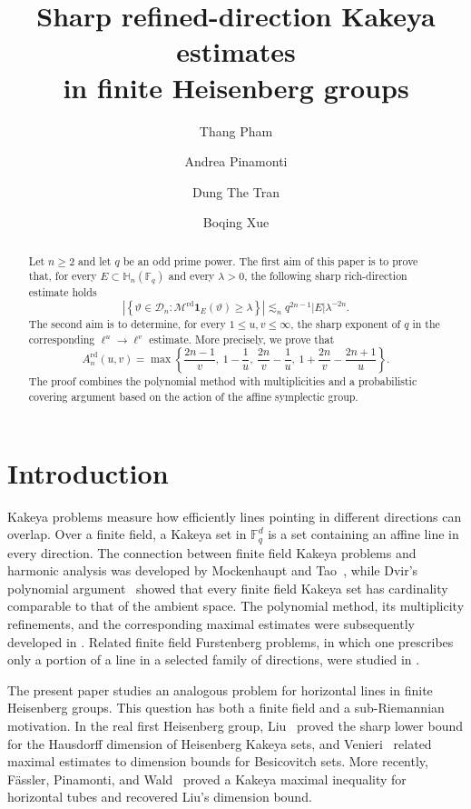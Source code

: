 \documentclass[11pt,letterpaper]{amsart}
\title[Refined-direction Kakeya estimates]
{Sharp refined-direction Kakeya estimates\\
in finite Heisenberg groups}
\author{Thang Pham}
\author{Andrea Pinamonti}
\author{Dung The Tran}
\author{Boqing Xue}
\numberwithin{equation}{section}
\theoremstyle{definition}
\theoremstyle{remark}
\newcommand{\Fq}{\mathbb F_q}
\begin{document}
\begin{abstract}
Let \(n\geq 2\) and let \(q\) be an odd prime power. The first aim of this
paper is to prove that, for every \(E\subset \mathbb{H}_n(\mathbb{F}_q)\)
and every \(\lambda>0\), the following sharp rich-direction estimate holds
\[
 \left|
 \left\{
 \vartheta\in\mathcal{D}_n:
 \mathcal{M}^{\mathrm{rd}}\mathbf{1}_E(\vartheta)\geq\lambda
 \right\}
 \right|
 \lesssim_n
 q^{2n-1}|E|\lambda^{-2n}.
\]
The second aim is to determine, for every \(1\leq u,v\leq\infty\), the
sharp exponent of \(q\) in the corresponding \(\ell^u\to\ell^v\)
estimate. More precisely, we prove that
\[
 A_n^{\mathrm{rd}}(u,v)
 =
 \max\left\{
 \frac{2n-1}{v},\
 1-\frac1u,\
 \frac{2n}{v}-\frac1u,\
 1+\frac{2n}{v}-\frac{2n+1}{u}
 \right\}.
\]
The proof combines the polynomial method with multiplicities and a
probabilistic covering argument based on the action of the affine
symplectic group.
\end{abstract}
\maketitle
\section{Introduction}
\label{sec:introduction}
Kakeya problems measure how efficiently lines pointing in different
directions can overlap. Over a finite field, a Kakeya set in $\Fq^d$ is a set containing an affine line in every direction. The connection between finite field Kakeya problems and harmonic analysis was developed by Mockenhaupt and Tao~\cite{MockenhauptTao04}, while Dvir's polynomial argument~\cite{Dvir09} showed that every finite field Kakeya set has cardinality comparable to that of the ambient space. The polynomial method, its multiplicity refinements, and the corresponding maximal estimates were subsequently developed in \cite{DKSS13,EOT10}. Related finite field Furstenberg problems, in which one prescribes only a portion of a line in a selected family of directions, were studied in \cite{DharDvirLund21,DharDvirLund24,EllenbergErman16}.

The present paper studies an analogous problem for horizontal lines in finite Heisenberg groups. This question has both a finite field and a sub-Riemannian motivation. In the real first Heisenberg group, Liu~\cite{Liu22} proved the sharp lower bound for the Hausdorff dimension of Heisenberg Kakeya sets, and Venieri~\cite{Venieri14} related maximal
estimates to dimension bounds for Besicovitch sets.  More recently, F\"assler, Pinamonti, and Wald~\cite{FasslerPinamontiWald25} proved a Kakeya maximal inequality for horizontal tubes and recovered Liu's
dimension bound.
\end{document}
